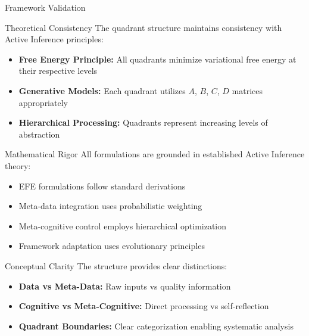 \documentclass[
  ignorenonframetext,
]{beamer}
\providecommand{\tightlist}{%
  \setlength{\itemsep}{0pt}\setlength{\parskip}{0pt}}
\begin{document}
\begin{frame}
\begin{block}{Framework Validation}
\protect{}\label{sec:framework_validation}
\begin{block}{Theoretical Consistency}
\protect{}\label{theoretical-consistency}
The quadrant structure maintains consistency with Active Inference
principles:

\begin{itemize}
\tightlist
\item
  \textbf{Free Energy Principle:} All quadrants minimize variational
  free energy at their respective levels
\item
  \textbf{Generative Models:} Each quadrant utilizes \(A\), \(B\),
  \(C\), \(D\) matrices appropriately
\item
  \textbf{Hierarchical Processing:} Quadrants represent increasing
  levels of abstraction
\end{itemize}
\end{block}

\begin{block}{Mathematical Rigor}
\protect{}\label{mathematical-rigor}
All formulations are grounded in established Active Inference theory:

\begin{itemize}
\tightlist
\item
  EFE formulations follow standard derivations
\item
  Meta-data integration uses probabilistic weighting
\item
  Meta-cognitive control employs hierarchical optimization
\item
  Framework adaptation uses evolutionary principles
\end{itemize}
\end{block}

\begin{block}{Conceptual Clarity}
\protect{}\label{conceptual-clarity}
The structure provides clear distinctions:

\begin{itemize}
\tightlist
\item
  \textbf{Data vs Meta-Data:} Raw inputs vs quality information
\item
  \textbf{Cognitive vs Meta-Cognitive:} Direct processing vs
  self-reflection
\item
  \textbf{Quadrant Boundaries:} Clear categorization enabling systematic
  analysis
\end{itemize}
\end{block}
\end{block}
\end{frame}
\end{document}
